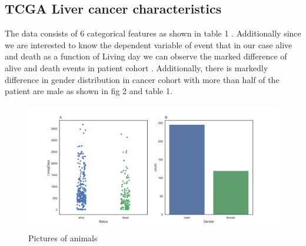 \documentclass[a4paper,9pt]{article}
\begin{document}
 	\subsection {TCGA Liver cancer characteristics}
 
 The data consists of 6 categorical features as shown in table 1 . Additionally since we are interested to know the dependent variable of event that in our case alive and death as a function of Living day we can observe the marked difference of alive and death events in patient cohort .  Additionally, there is markedly difference in gender distribution  in cancer cohort with more than half of the patient are male as shown in fig 2  and table 1. 

 

\begin{figure}[bh]
    \centering
      \includegraphics[width=\textwidth]{Genderandstatus.png}
    \caption{Pictures of animals}\label{fig:animals}
\end{figure}
\end{document}
